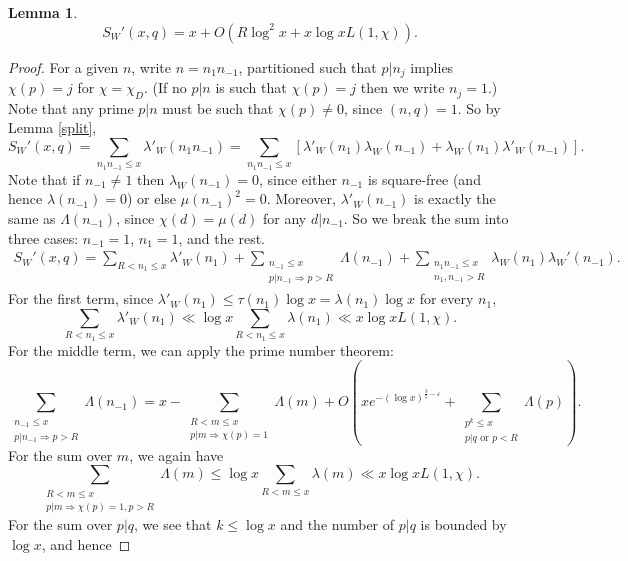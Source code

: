\documentclass{amsart}
\newtheorem{lemma}[theorem]{Lemma}
\begin{document}
\begin{lemma}\label{SWx}
$$S_W'(x,q)=x+O\left(R\log^2 x+x\log xL(1,\chi)\right).$$
\end{lemma}
\begin{proof}
For a given $n$, write $n=n_1n_{-1}$, partitioned such that $p|n_j$ implies $\chi(p)=j$ for $\chi=\chi_D$.  (If no $p|n$ is such that $\chi(p)=j$ then we write $n_j=1$.)  Note that any prime $p|n$ must be such that $\chi(p)\neq 0$, since $(n,q)=1$.  So by Lemma \ref{split},
$$S_W'(x,q)=\sum_{n_1n_{-1}\leq x}\lambda'_W\left(n_1n_{-1}\right)=\sum_{n_1n_{-1}\leq x}\left[\lambda'_W\left(n_1\right)\lambda_W\left(n_{-1}\right)+\lambda_W\left(n_1\right) \lambda'_W\left(n_{-1}\right)\right].$$
Note that if $n_{-1}\neq 1$ then $\lambda_W\left(n_{-1}\right)=0$, since either $n_{-1}$ is square-free (and hence $\lambda\left(n_{-1}\right)=0$) or else $\mu(n_{-1})^2=0$.  Moreover, $\lambda'_W\left(n_{-1}\right)$ is exactly the same as $\Lambda\left(n_{-1}\right)$, since $\chi(d)=\mu(d)$ for any $d|n_{-1}$. So we break the sum into three cases: $n_{-1}=1$, $n_1=1$, and the rest.
\begin{gather}\label{DWLambda}
S_W'(x,q)=\sum_{R<n_1\leq x}\lambda'_W\left(n_1\right)+\sum_{\substack{n_{-1}\leq x \\ p|n_{-1}\Rightarrow p>R}}\Lambda\left(n_{-1}\right)+\sum_{\substack{n_1n_{-1}\leq x \\ n_1,n_{-1}>R }}\lambda_W\left(n_1\right) \lambda_W'\left(n_{-1}\right).
\end{gather}
For the first term, since $\lambda'_W\left(n_{1}\right)\leq \tau\left(n_1\right)\log x=\lambda\left(n_1\right)\log x$ for every $n_1$,
$$\sum_{R<n_1\leq x}\lambda'_W\left(n_1\right)\ll \log x\sum_{R<n_1\leq x}\lambda\left(n_1\right)\ll x\log xL(1,\chi).$$
For the middle term, we can apply the prime number theorem:
$$\sum_{\substack{n_{-1}\leq x \\ p|n_{-1}\Rightarrow p>R}}\Lambda\left(n_{-1}\right)=x-\sum_{\substack{R<m\leq x \\ p|m\Rightarrow \chi(p)=1}}\Lambda(m)+O\left(xe^{-(\log x)^{\frac 35-\varepsilon}}+\sum_{\substack{p^k\leq x\\ p|q\mbox{ or }p<R }}\Lambda(p)\right).$$
For the sum over $m$, we again have
$$\sum_{\substack{R<m\leq x \\ p|m\Rightarrow \chi(p)=1,p>R}}\Lambda(m)\leq \log x\sum_{R<m\leq x}\lambda(m)\ll x\log xL(1,\chi).$$
For the sum over $p|q$, we see that $k\leq \log x$ and the number of $p|q$ is bounded by $\log x$, and hence

\end{proof}
\end{document}
